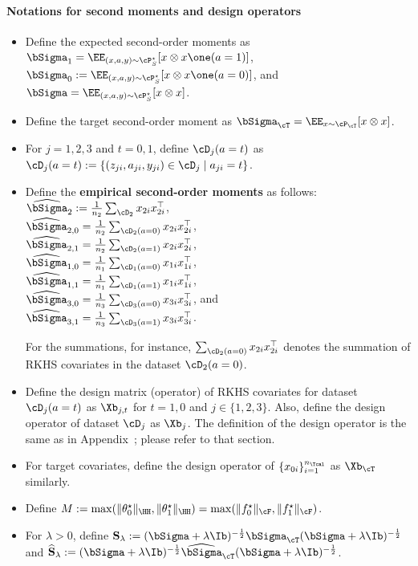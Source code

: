 \documentclass[12pt,a4paper,pdftex,onepage]{article}
\newcommand{\Sighat}{\widehat{{\bSigma}}}
\newcommand{\Sbar}{\mathbf{S}}
\newcommand{\Shat}{\widehat{\mathbf{S}}}
\newcommand{\Sigmatreated}{\bSigma_{1}}
\newcommand{\Sigmacontrol}{\bSigma_{0}}
\begin{document}
\paragraph*{Notations for second moments and design operators}
\begin{itemize}
\item Define the expected second-order moments as $\Sigmatreated= \EE_{(x,a,y) \sim \cP^\star_S}[x \otimes x \one(a=1)]$, $\Sigmacontrol := \EE_{(x,a,y) \sim \cP^\star_S}[x \otimes x \one(a=0)]$, and $\bSigma = \EE_{(x,a,y) \sim \cP^\star_S}[x \otimes x]$.  

\item Define the target second-order moment as $\bSigma_\cT = \EE_{x \sim \cP_\cT} [x \otimes x]$.

\item For $j =1,2,3$ and $t= 0,1$, define $\cD_{j}(a=t)$ as 
\(\cD_j(a=t ) :=  \{(z_{ji}, a_{ji}, y_{ji}) \in \cD_j \mid a_{ji} = t\}\).

\item Define the \textbf{empirical second-order moments} as follows: \\
$\Sighat_2 := \frac{1}{n_2}\sum_{\cD_2} x_{2i}x_{2i}^\top$, \\
$\Sighat_{2,0} = \frac{1}{n_2}\sum_{\cD_2(a=0)} x_{2i}x_{2i}^\top$, \\
$\Sighat_{2,1} = \frac{1}{n_{2}}\sum_{\cD_2(a=1)} x_{2i}x_{2i}^\top$, \\
$\Sighat_{1,0} = \frac{1}{n_{1}}\sum_{\cD_{1}(a=0)} x_{1i}x_{1i}^\top$, \\
$\Sighat_{1,1} = \frac{1}{n_{1}}\sum_{\cD_{1}(a=1)} x_{1i}x_{1i}^\top$,
\\
$\Sighat_{3,0} =\frac{1}{n_{3}}\sum_{\cD_{3}(a=0)} x_{3i}x_{3i}^\top$, and \\
$\Sighat_{3,1} = \frac{1}{n_{3}}\sum_{\cD_{3}(a=1)} x_{3i}x_{3i}^\top$.

For the summations, for instance, $\sum_{\cD_2(a=0)} x_{2i}x_{2i}^\top$ denotes the summation of RKHS covariates in the dataset $\cD_2(a=0)$.

\item Define the design matrix (operator) of RKHS covariates for dataset $\cD_j(a=t)$ as $\Xb_{j,t}$ for $t=1,0$ and \(j \in \{1,2,3 \}\).
Also, define the design operator of dataset \(\cD_j\) as \(\Xb_j\).
The definition of the design operator is the same as in Appendix~; please refer to that section.

\item For target covariates, define the design operator of \(\{x_{0i}\}_{i=1}^{n_\Tcal}\) as $\Xb_\cT$ similarly.

\item Define \(M := \max( \|\theta_0^\star \|_\HH, \|\theta_1^\star \|_\HH) =\max( \|f_0^\star \|_\cF, \|f_1^\star \|_\cF)\).

\item For $\lambda>0$, define $\Sbar_\lambda := (\bSigma + \lambda \Ib)^{-\frac{1}{2}} \bSigma_{\cT} (\bSigma + \lambda \Ib)^{-\frac{1}{2}}$ and $\Shat_\lambda := (\bSigma + \lambda \Ib)^{-\frac{1}{2}} \Sighat_{\cT} (\bSigma + \lambda \Ib)^{-\frac{1}{2}}$.
\end{itemize}
\end{document}
